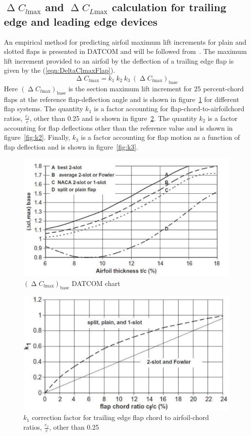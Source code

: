 \subsection{$\upDelta C_{l\text{max}}$ and  $\upDelta C_{L\text{max}}$ calculation for trailing edge and leading edge devices}
An empirical method for predicting airfoil maximum lift increments for plain and slotted flaps is presented in \gls{DATCOM} and will be followed from~\cite{sforza2014commercial}.
%
The maximum lift increment provided to an airfoil by the deflection of a trailing edge flap is given by the (\ref{eqn:DeltaClmaxFlap}).
%
\begin{equation}
\upDelta C_{l\text{max}}=k_1\ k_2\ k_3\ \left(\upDelta C_{l\text{max}}\right)_{\text{base}}
\label{eqn:DeltaClmaxFlap}
\end{equation}
%
\noindent
Here $\left(\upDelta C_{l\text{max}}\right)_{\text{base}}$ is the section maximum lift increment for 25 percent-chord flaps at the reference flap-deflection angle and is shown in figure~\ref{fig:DeltaClmaxBase} for different flap systems. The quantity $k_1$ is a factor accounting for flap-chord-to-airfoilchord ratios, $\frac{c_{f}}{c}$, other than 0.25 and is shown in figure~\ref{fig:k1}. The quantity $k_2$ is a factor accounting for flap deflections other than the reference value and is shown in figure~\ref{fig:k2}. Finally, $k_3$ is a factor accounting for flap motion as a function of flap deflection and is shown in figure~\ref{fig:k3}.
%
\begin{figure}[!b]
  \centering
  \includegraphics[width=0.8\linewidth]{DeltaClmax_Base}
  \caption{$\left(\upDelta C_{l\text{max}}\right)_{\text{base}}$ DATCOM chart}
  \label{fig:DeltaClmaxBase}
\end{figure}
%
\begin{figure}[H]
  \centering
  \includegraphics[width=0.8\linewidth]{K1}
  \caption{$k_1$ correction factor for trailing edge flap chord to airfoil-chord ratios, $\frac{c_{f}}{c}$, other than 0.25}
  \label{fig:k1}
\end{figure}
